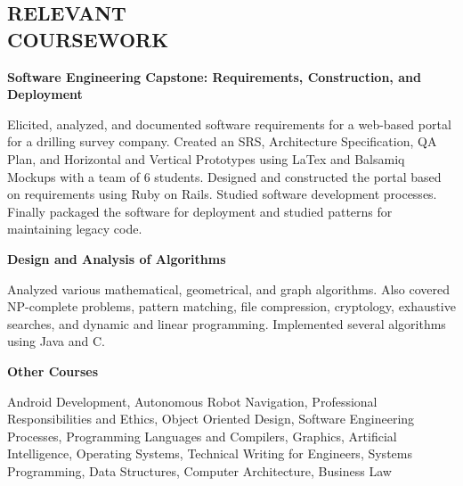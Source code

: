 \documentclass[margin,line]{resume}
\begin{document}
\begin{resume}
\sectionline

    \section{\mysidestyle \textbf{\large{R}\small{ELEVANT\\COURSEWORK}}} 

      \textbf{Software Engineering Capstone: Requirements, Construction, and Deployment}\\\vspace{-3mm}
      \begin{myindentpar}{\identsize}
        Elicited, analyzed, and documented software requirements for a web-based portal for a drilling survey company. Created an SRS, Architecture Specification, QA Plan, and Horizontal and Vertical Prototypes using LaTex and Balsamiq Mockups with a team of 6 students. Designed and constructed the portal based on requirements using Ruby on Rails. Studied software development processes. Finally packaged the software for deployment and studied patterns for maintaining legacy code.
      \end{myindentpar}
      \vspace{-2mm}
      
      \textbf{Design and Analysis of Algorithms}\\\vspace{-3mm}
      \begin{myindentpar}{\identsize}
        Analyzed various mathematical, geometrical, and graph algorithms. Also covered NP-complete problems, pattern matching, file compression, cryptology, exhaustive searches, and dynamic and linear programming. Implemented several algorithms using Java and C.
      \end{myindentpar}
      \vspace{-2mm}
      
      \textbf{Other Courses}\\\vspace{-3mm}
      \begin{myindentpar}{\identsize}
Android Development, Autonomous Robot Navigation, Professional Responsibilities and Ethics, Object Oriented Design, Software Engineering Processes, Programming Languages and Compilers, Graphics, Artificial Intelligence, Operating Systems, Technical Writing for Engineers, Systems Programming, Data Structures, Computer Architecture, Business Law
      \end{myindentpar}


\end{resume}
\end{document}
